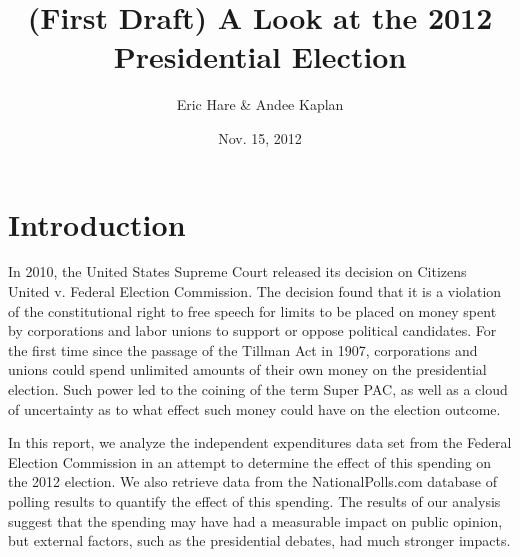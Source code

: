 \documentclass[11pt]{article}\usepackage{graphicx, color}
\begin{document}
\setlength{\parskip}{3ex}
\setlength{\parindent}{0pt}

\title{(First Draft) A Look at the 2012 Presidential Election}
\author{Eric Hare \& Andee Kaplan}
\date{Nov. 15, 2012}

\maketitle

\section{Introduction}
In 2010, the United States Supreme Court released its decision on Citizens United v. Federal Election Commission. The decision found that it is a violation of the constitutional right to free speech for limits to be placed on money spent by corporations and labor unions to support or oppose political candidates. For the first time since the passage of the Tillman Act in 1907, corporations and unions could spend unlimited amounts of their own money on the presidential election. Such power led to the coining of the term Super PAC, as well as a cloud of uncertainty as to what effect such money could have on the election outcome.

In this report, we analyze the independent expenditures data set from the Federal Election Commission in an attempt to determine the effect of this spending on the 2012 election. We also retrieve data from the NationalPolls.com database of polling results to quantify the effect of this spending. The results of our analysis suggest that the spending may have had a measurable impact on public opinion, but external factors, such as the presidential debates, had much stronger impacts.
\end{document}
